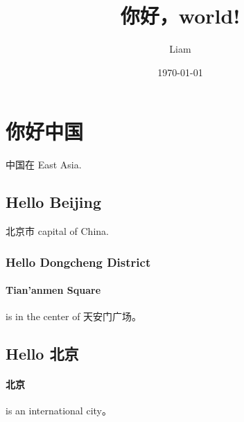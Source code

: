 \documentclass[UTF8]{ctexart}
\title{你好，world!}
\author{Liam}
\date{\today}
\begin{document}
	\maketitle
	\section{你好中国}
	中国在 East Asia.
	\subsection{Hello Beijing}
	北京市 capital of China.
	
	\subsubsection{Hello Dongcheng District}
	\paragraph{Tian'anmen Square} is in the center of 天安门广场。
	\subsection{Hello 北京}
	\paragraph{北京} is an international city。
\end{document}
